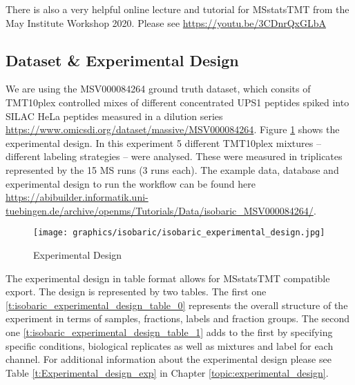 \noindent There is also a very helpful online lecture and tutorial for MSstatsTMT from the May Institute Workshop 2020. Please see \url{https://youtu.be/3CDnrQxGLbA}

\subsection{Dataset \& Experimental Design}
We are using the MSV000084264 ground truth dataset, which consits of TMT10plex controlled mixes of different concentrated UPS1 peptides spiked into SILAC HeLa peptides measured in a dilution series \url{https://www.omicsdi.org/dataset/massive/MSV000084264}. Figure \ref{fig:isobaric_experimental_design} shows the experimental design. In this experiment 5 different TMT10plex mixtures -- different labeling strategies -- were analysed. These were measured in triplicates represented by the 15 MS runs (3 runs each). The example data, database and experimental design to run the workflow can be found here \url{https://abibuilder.informatik.uni-tuebingen.de/archive/openms/Tutorials/Data/isobaric_MSV000084264/}.

\begin{figure}[htbp]
  \centering
 \texttt{[image: graphics/isobaric/isobaric\_experimental\_design.jpg]}
  \caption{Experimental Design}
  \label{fig:isobaric_experimental_design}
\end{figure}
  
\noindent The experimental design in table format allows for MSstatsTMT compatible export. The design is represented by two tables. The first one \ref{t:isobaric_experimental_design_table_0} represents the overall structure of the experiment in terms of samples, fractions, labels and fraction groups. The second one \ref{t:isobaric_experimental_design_table_1} adds to the first by specifying specific conditions, biological replicates as well as mixtures and label for each channel. For additional information about the experimental design please see Table  \ref{t:Experimental_design_exp} in Chapter \ref{topic:experimental_design}. 

